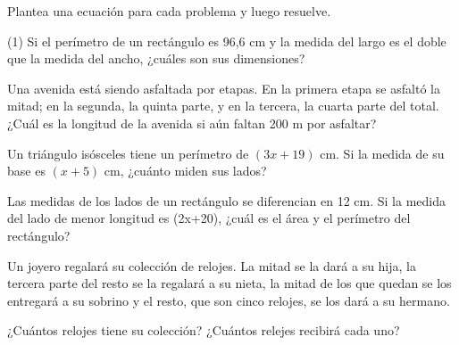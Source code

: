 \documentclass[sin nombre]{plantilla-evaluacion-v1}
\begin{document}
\begin{partes}
\parte Plantea una ecuación para cada problema y luego resuelve.
\begin{ejercicios}(1)
  \ejercicio Si el perímetro de un rectángulo es 96,6 cm y la medida del largo
  es el doble que la medida del ancho, ¿cuáles son sus dimensiones?
  \begin{malla}[height=5cm]
  \end{malla}
  \ejercicio Una avenida está siendo asfaltada por etapas. En la primera etapa
  se asfaltó la mitad; en la segunda, la quinta parte, y en la tercera, la 
  cuarta parte del total. ¿Cuál es la longitud de la avenida si aún faltan 
  200 m por asfaltar?
  \begin{malla}[height=5cm]
  \end{malla}
  \ejercicio Un triángulo isósceles tiene un perímetro de $(3x+19)$ cm. Si la medida
  de su base es $(x+5)$ cm, ¿cuánto miden sus lados?
  \begin{malla}[height=5cm]
  \end{malla} 
  \ejercicio Las medidas de los lados de un rectángulo se diferencian en 12 cm. Si la 
  medida del lado de menor longitud es (2x+20), ¿cuál es el área y el perímetro del 
  rectángulo?
  \begin{malla}[height=5cm]
  \end{malla}
  \ejercicio Un joyero regalará su colección de relojes. La mitad se la dará a su hija,
  la tercera parte del resto se la regalará a su nieta, la mitad de los que quedan se los
  entregará a su sobrino y el resto, que son cinco relojes, se los dará a su hermano.
  \begin{preguntas}
    \pregunta ¿Cuántos relojes tiene su colección?
    \pregunta ¿Cuántos relejes recibirá cada uno?
  \end{preguntas}
  \begin{malla}[height=8cm]
  \end{malla}
\end{ejercicios}
\end{partes}
\end{document}
